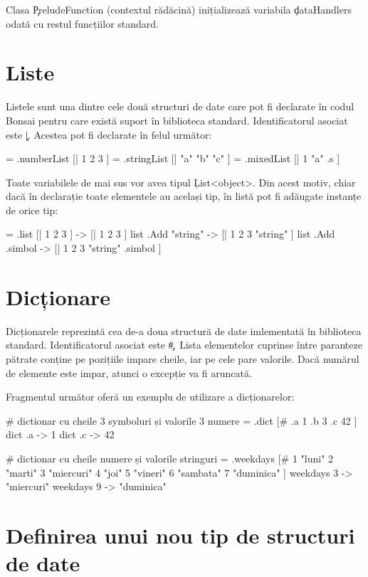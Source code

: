 \documentclass[12pt,a4paper]{memoir}
\begin{document}
Clasa \c{PreludeFunction} (contextul rădăcină) inițializează variabila \c{dataHandlers} odată cu restul funcțiilor standard.

\section{Liste}

Listele sunt una dintre cele două structuri de date care pot fi declarate în codul Bonsai pentru care există suport în biblioteca standard. Identificatorul asociat este \c{|}. Acestea pot fi declarate în felul următor:
\begin{code}
= .numberList [| 1 2 3 ]
= .stringList [| "a" "b" "c" ]
= .mixedList [| 1 "a" .s ]
\end{code}

Toate variabilele de mai sus vor avea tipul \c{List<object>}. Din acest motiv, chiar dacă în declarație toate elementele au același tip, în listă pot fi adăugate instanțe de orice tip:

\begin{code}
= .list [| 1 2 3 ]
  -> [| 1 2 3 ]
list .Add "string"
  -> [| 1 2 3 "string" ]
list .Add .simbol
  -> [| 1 2 3 "string" .simbol ]
\end{code}

\section{Dicționare}

Dicționarele reprezintă cea de-a doua structură de date imlementată în biblioteca standard. Identificatorul asociat este \c{\#}. Lista elementelor cuprinse între paranteze pătrate conține pe pozițiile impare cheile, iar pe cele pare valorile. Dacă numărul de elemente este impar, atunci o excepție va fi aruncată.

Fragmentul următor oferă un exemplu de utilizare a dicționarelor:
\begin{code}
# dictionar cu cheile 3 symboluri și valorile 3 numere
= .dict [# .a 1 .b 3 .c 42 ]
dict .a 
  -> 1
dict .c
  -> 42

# dictionar cu cheile numere și valorile stringuri
= .weekdays [#
  1 "luni" 
  2 "marti" 
  3 "miercuri"
  4 "joi"
  5 "vineri"
  6 "sambata"
  7 "duminica"
]
weekdays 3
  -> "miercuri"
weekdays 9
  -> "duminica"
\end{code}

\section{Definirea unui nou tip de structuri de date}
\end{document}
